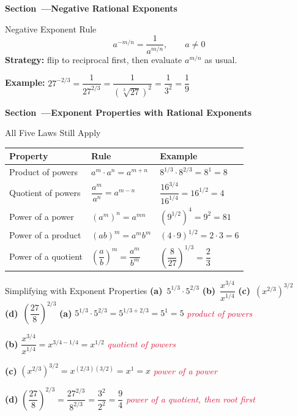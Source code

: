 \documentclass[12pt]{article}
\newcounter{mysec}
\newcommand{\mysection}[1]{%
  \stepcounter{mysec}%
  \vspace{14pt}%
  \noindent
  \begin{tcolorbox}[enhanced,colback=navy,colframe=navy,
    boxrule=0pt,arc=3pt,left=8pt,right=8pt,top=5pt,bottom=5pt,
    before skip=0pt,after skip=10pt]
    \color{white}\bfseries\large Section~\themysec\enspace---\enspace #1
  \end{tcolorbox}}
\newcommand{\step}[1]{\hfill\textcolor{crimson}{\small\textit{#1}}}
\begin{document}
\mysection{Negative Rational Exponents}

\begin{conceptbox}{Negative Exponent Rule}
\[
  \boxed{a^{-m/n} = \frac{1}{a^{m/n}}}, \qquad a \neq 0
\]
\textbf{Strategy:} flip to reciprocal first, then evaluate $a^{m/n}$ as usual.

\medskip
\textbf{Example:}\quad
$27^{-2/3}
=\dfrac{1}{27^{2/3}}
=\dfrac{1}{(\sqrt[3]{27})^2}
=\dfrac{1}{3^2}
=\dfrac{1}{9}$
\end{conceptbox}

\mysection{Exponent Properties with Rational Exponents}

\begin{conceptbox}{All Five Laws Still Apply}
\begin{center}
\renewcommand{\arraystretch}{1.6}
\begin{tabular}{@{}lll@{}}
\toprule
\textbf{Property} & \textbf{Rule} & \textbf{Example} \\
\midrule
Product of powers  & $a^m\cdot a^n=a^{m+n}$
  & $8^{1/3}\cdot8^{2/3}=8^1=8$ \\
Quotient of powers & $\dfrac{a^m}{a^n}=a^{m-n}$
  & $\dfrac{16^{3/4}}{16^{1/4}}=16^{1/2}=4$ \\
Power of a power   & $(a^m)^n=a^{mn}$
  & $(9^{1/2})^4=9^2=81$ \\
Power of a product & $(ab)^m=a^m b^m$
  & $(4\cdot9)^{1/2}=2\cdot3=6$ \\
Power of a quotient& $\left(\dfrac{a}{b}\right)^m=\dfrac{a^m}{b^m}$
  & $\left(\dfrac{8}{27}\right)^{1/3}=\dfrac{2}{3}$ \\
\bottomrule
\end{tabular}
\end{center}
\end{conceptbox}

\begin{examplebox}{Simplifying with Exponent Properties}
\textbf{(a)}~$5^{1/3}\cdot5^{2/3}$\quad
\textbf{(b)}~$\dfrac{x^{3/4}}{x^{1/4}}$\quad
\textbf{(c)}~$(x^{2/3})^{3/2}$\quad
\textbf{(d)}~$\left(\dfrac{27}{8}\right)^{2/3}$
\tcblower
\textbf{(a)} $5^{1/3}\cdot5^{2/3}=5^{1/3+2/3}=5^1=5$ \step{product of powers}

\medskip
\textbf{(b)} $\dfrac{x^{3/4}}{x^{1/4}}=x^{3/4-1/4}=x^{1/2}$ \step{quotient of powers}

\medskip
\textbf{(c)} $(x^{2/3})^{3/2}=x^{(2/3)(3/2)}=x^1=x$ \step{power of a power}

\medskip
\textbf{(d)} $\left(\dfrac{27}{8}\right)^{2/3}=\dfrac{27^{2/3}}{8^{2/3}}=\dfrac{3^2}{2^2}=\dfrac{9}{4}$ \step{power of a quotient, then root first}
\end{examplebox}
\end{document}
